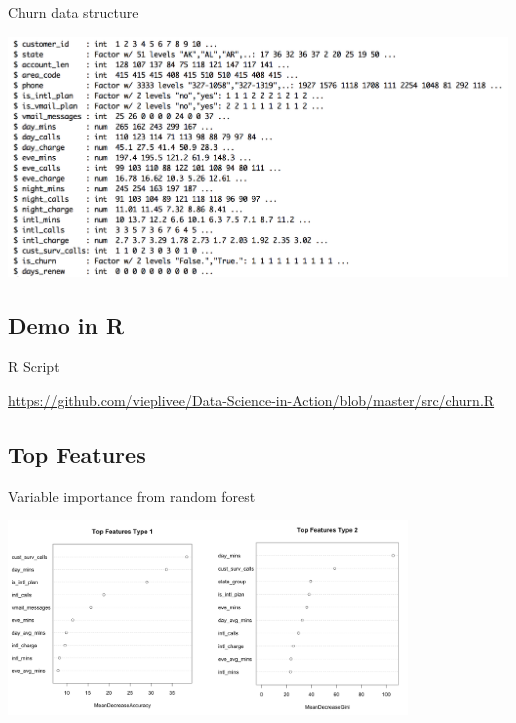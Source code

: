 \documentclass[10pt]{beamer}
\begin{document}
    \begin{frame}{Churn data structure}
      \begin{center}
        \includegraphics[height=180pt]{../graphs/dataset_churn_str}
      \end{center}
    \end{frame}

  \subsection{Demo in R}

    \begin{frame}{R Script}
        \begin{center}
          {\large \url{https://github.com/vieplivee/Data-Science-in-Action/blob/master/src/churn.R}}
        \end{center}
    \end{frame}
    
  \subsection{Top Features}
  
    \begin{frame}{Variable importance from random forest}
        \begin{center}
          \includegraphics[width=300pt]{../graphs/rf_var_importance}
        \end{center}
    \end{frame}
\end{document}
